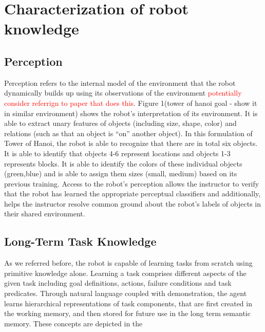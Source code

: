 \documentclass[letterpaper]{article}
\begin{document}
\section{Characterization of robot knowledge}
\subsection{Perception}
Perception refers to the internal model of the environment that the robot dynamically builds up using its observations of the environment \textcolor{red}{potentially consider referrign to paper that does this}. Figure 1(tower of hanoi goal - show it in similar environment) shows the robot's interpretation of its environment. It is able to extract unary features of objects (including size, shape, color) and relations (such as that an object is ``on'' another object). In this formulation of Tower of Hanoi, the robot is able to recognize that there are in total six objects. It is able to identify that objects 4-6 represent locations and objects 1-3 represents blocks. It is able to identify the colors of these individual objects (green,blue) and is able to assign them sizes (small, medium) based on its previous training. Access to the robot's perception allows the instructor to verify that the robot has learned the appropriate perceptual classifiers and additionally, helps the instructor resolve common ground about the robot's labels of objects in their shared environment.

\subsection{Long-Term Task Knowledge}
As we referred before, the robot is capable of learning tasks from scratch using primitive knowledge alone. Learning a task comprises different aspects of the given task including goal definitions, actions, failure conditions and task predicates. Through natural language coupled with demonstration, the agent learns hierarchical representations of task components, that are first created in the working memory, and then stored for future use in the long term semantic memory. These concepts are depicted in the 
\end{document}
